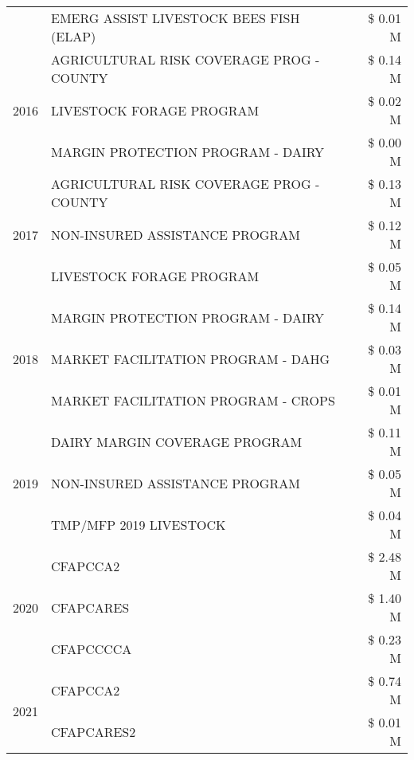 \begin{tabular}{llr}
 & EMERG ASSIST LIVESTOCK BEES FISH (ELAP) & \$ 0.01 M \\
\cline{1-3}
\multirow[t]{3}{*}{2016} & AGRICULTURAL RISK COVERAGE PROG - COUNTY & \$ 0.14 M \\
 & LIVESTOCK FORAGE PROGRAM & \$ 0.02 M \\
 & MARGIN PROTECTION PROGRAM - DAIRY & \$ 0.00 M \\
\cline{1-3}
\multirow[t]{3}{*}{2017} & AGRICULTURAL RISK COVERAGE PROG - COUNTY & \$ 0.13 M \\
 & NON-INSURED ASSISTANCE PROGRAM & \$ 0.12 M \\
 & LIVESTOCK FORAGE PROGRAM & \$ 0.05 M \\
\cline{1-3}
\multirow[t]{3}{*}{2018} & MARGIN PROTECTION PROGRAM - DAIRY & \$ 0.14 M \\
 & MARKET FACILITATION PROGRAM - DAHG & \$ 0.03 M \\
 & MARKET FACILITATION PROGRAM - CROPS & \$ 0.01 M \\
\cline{1-3}
\multirow[t]{3}{*}{2019} & DAIRY MARGIN COVERAGE PROGRAM & \$ 0.11 M \\
 & NON-INSURED ASSISTANCE PROGRAM & \$ 0.05 M \\
 & TMP/MFP 2019 LIVESTOCK & \$ 0.04 M \\
\cline{1-3}
\multirow[t]{3}{*}{2020} & CFAPCCA2 & \$ 2.48 M \\
 & CFAPCARES & \$ 1.40 M \\
 & CFAPCCCCA & \$ 0.23 M \\
\cline{1-3}
\multirow[t]{2}{*}{2021} & CFAPCCA2 & \$ 0.74 M \\
 & CFAPCARES2 & \$ 0.01 M \\
\cline{1-3}
\bottomrule
\end{tabular}
